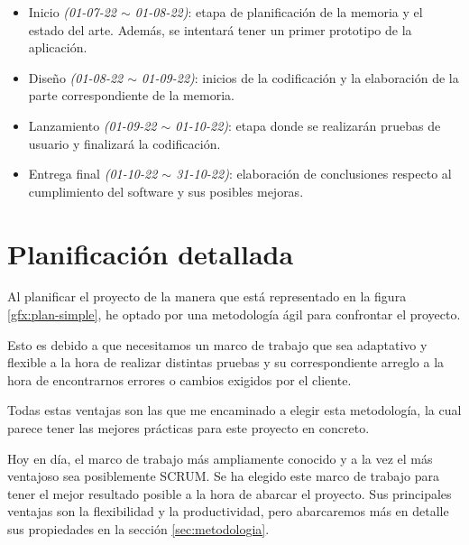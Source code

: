 \newpage

\begin{itemize}
    \item Inicio \textit{(01-07-22 $\sim$ 01-08-22)}: etapa de planificación de la memoria y el estado del arte. Además, se intentará tener un primer prototipo de la aplicación.
    \item Diseño \textit{(01-08-22 $\sim$ 01-09-22)}: inicios de la codificación y la elaboración de la parte correspondiente de la memoria.
    \item Lanzamiento \textit{(01-09-22 $\sim$ 01-10-22)}: etapa donde se realizarán pruebas de usuario y finalizará la codificación.
    \item Entrega final \textit{(01-10-22 $\sim$ 31-10-22)}: elaboración de conclusiones respecto al cumplimiento del software y sus posibles mejoras.
\end{itemize}

\section{Planificación detallada}\label{ch:planificacion_detallada}

Al planificar el proyecto de la manera que está representado en la figura \ref{gfx:plan-simple}, he optado por una metodología ágil para confrontar el proyecto.

\vspace{0.3cm}

Esto es debido a que necesitamos un marco de trabajo que sea adaptativo y flexible a la hora de realizar distintas pruebas y su correspondiente arreglo a la hora de encontrarnos errores o cambios exigidos por el cliente.

\vspace{0.3cm}

Todas estas ventajas son las que me encaminado a elegir esta metodología, la cual parece tener las mejores prácticas para este proyecto en concreto.

\vspace{0.3cm}

Hoy en día, el marco de trabajo más ampliamente conocido y a la vez el más ventajoso sea posiblemente SCRUM. Se ha elegido este marco de trabajo para tener el mejor resultado posible a la hora de abarcar el proyecto. Sus principales ventajas son la flexibilidad y la productividad, pero abarcaremos más en detalle sus propiedades en la sección \ref{sec:metodologia}.

\vspace{0.3cm}


